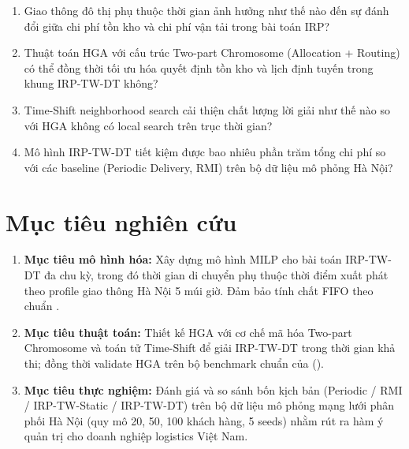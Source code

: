 \documentclass[12pt,a4paper]{article}
\newcommand{\boldterm}[1]{\textbf{\color{primary}#1}}
\newcommand{\citealias}[1]{\citeauthor{#1} (\citeyear{#1})}
\begin{document}
\begin{enumerate}[leftmargin=*, label=\textbf{Q\arabic{*}.}, itemsep=6pt]
  \item Giao thông đô thị phụ thuộc thời gian ảnh hưởng như thế nào đến sự đánh đổi
        giữa chi phí tồn kho và chi phí vận tải trong bài toán IRP?

  \item Thuật toán HGA với cấu trúc Two-part Chromosome (Allocation + Routing)
        có thể đồng thời tối ưu hóa quyết định tồn kho và lịch định tuyến
        trong khung IRP-TW-DT không?

  \item Time-Shift neighborhood search cải thiện chất lượng lời giải như thế nào
        so với HGA không có local search trên trục thời gian?

  \item Mô hình IRP-TW-DT tiết kiệm được bao nhiêu phần trăm tổng chi phí so với
        các baseline (Periodic Delivery, RMI) trên bộ dữ liệu mô phỏng Hà Nội?
\end{enumerate}

\section{Mục tiêu nghiên cứu}

\begin{enumerate}[leftmargin=*, label=\textbf{M\arabic*}.\ , itemsep=8pt]
  \item \boldterm{Mục tiêu mô hình hóa:}
    Xây dựng mô hình MILP cho bài toán IRP-TW-DT đa chu kỳ, trong đó thời gian di
    chuyển phụ thuộc thời điểm xuất phát theo profile giao thông Hà Nội 5 múi giờ.
    Đảm bảo tính chất FIFO theo chuẩn \citep{ichoua2003vehicle}.

  \item \boldterm{Mục tiêu thuật toán:}
    Thiết kế HGA với cơ chế mã hóa Two-part Chromosome và toán tử Time-Shift để giải
    IRP-TW-DT trong thời gian khả thi; đồng thời validate HGA trên bộ benchmark chuẩn
    của \citealias{archetti2007branch}.

  \item \boldterm{Mục tiêu thực nghiệm:}
    Đánh giá và so sánh bốn kịch bản (Periodic / RMI / IRP-TW-Static / IRP-TW-DT)
    trên bộ dữ liệu mô phỏng mạng lưới phân phối Hà Nội (quy mô 20, 50, 100 khách
    hàng, 5 seeds) nhằm rút ra hàm ý quản trị cho doanh nghiệp logistics Việt Nam.
\end{enumerate}
\end{document}
